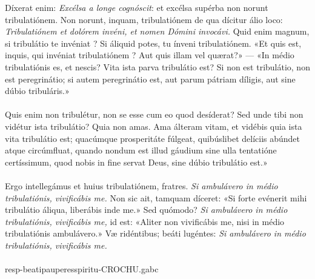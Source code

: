 \documentclass[options]{article}
\begin{document}
Díxerat enim: \emph{Excélsa a longe cognóscit}: et excélsa supérba non norunt tribulatiónem. Non norunt, inquam, tribulatiónem de qua dícitur álio loco: \emph{Tribulatiónem et dolórem invéni, et nomen Dómini invocávi.} Quid enim magnum, si tribulátio te invéniat ? Si áliquid potes, tu ínveni tribulatiónem. «Et quis est, inquis, qui invéniat tribulatiónem ? Aut quis illam vel quærat?» — «In médio tribulatiónis es, et nescis? Vita ista parva tribulátio est? Si non est tribulátio, non est peregrinátio; si autem peregrinátio est, aut parum pátriam díligis, aut sine dúbio tribuláris.»\\
\\	
Quis enim non tribulétur, non se esse cum eo quod desíderat? Sed unde tibi non vidétur ista tribulátio? Quia non amas. Ama álteram vitam, et vidébis quia ista vita tribulátio est; quacúmque prosperitáte fúlgeat, quibúslibet delíciis abúndet atque circúmfluat, quando nondum est illud gáudium sine ulla tentatióne certíssimum, quod nobis in fine servat Deus, sine dúbio tribulátio est.»\\
\\	
Ergo intellegámus et huius tribulatiónem, fratres. \emph{Si ambulávero in médio tribulatiónis, vivificábis me.} Non sic ait, tamquam díceret: «Si forte evénerit mihi tribulátio áliqua, liberábis inde me.» Sed quómodo? \emph{Si ambulávero in médio tribulatiónis, vivificábis me,} id est: «Aliter non vivificábis me, nisi in médio tribulatiónis ambulávero.» Væ ridéntibus; beáti lugéntes: \emph{Si ambulávero in médio tribulatiónis, vivificábis me.}\\
\\
resp-beatipauperesspiritu-CROCHU.gabc
\end{document}
